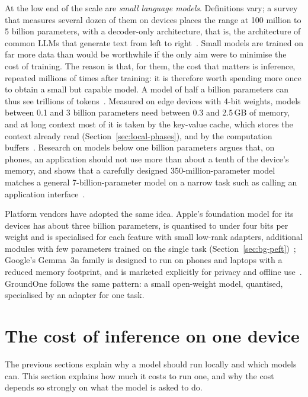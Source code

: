 At the low end of the scale are \emph{small language models}. Definitions vary; a survey that measures several dozen of them on
devices places the range at 100 million to 5 billion parameters, with a decoder-only architecture, that is, the
architecture of common LLMs that generate text from left to right~\cite{lu2024slm}. Small models are trained on far more
data than would be worthwhile if the only aim were to minimise the cost of training. The reason is that, for them, the
cost that matters is inference, repeated millions of times after training: it is therefore worth spending more once to
obtain a small but capable model. A model of half a billion parameters can thus see trillions of
tokens~\cite{lu2024slm}. Measured on edge devices with 4-bit weights, models between 0.1 and 3 billion parameters need
between 0.3 and 2.5\,GB of memory, and at long context most of it is taken by the key-value cache, which stores the
context already read (Section~\ref{sec:local-phases}), and by the computation buffers~\cite{lu2024slm}. Research on models below one billion parameters argues that, on phones, an application should not use
more than about a tenth of the device's memory, and shows that a carefully designed 350-million-parameter model matches a
general 7-billion-parameter model on a narrow task such as calling an application interface~\cite{liu2024mobilellm}.

Platform vendors have adopted the same idea. Apple's foundation model for its devices has about three billion parameters,
is quantised to under four bits per weight and is specialised for each feature with small low-rank adapters, additional
modules with few parameters trained on the single task (Section~\ref{sec:bg-peft})~\cite{gunter2024apple}; Google's Gemma~3n family is designed to run on phones and laptops with a reduced memory
footprint, and is marketed explicitly for privacy and offline use~\cite{google2025gemma3n}. GroundOne follows the same
pattern: a small open-weight model, quantised, specialised by an adapter for one task.

\section{The cost of inference on one device}
\label{sec:bg-inference}

The previous sections explain why a model should run locally and which models can. This section explains how much it
costs to run one, and why the cost depends so strongly on what the model is asked to do.

